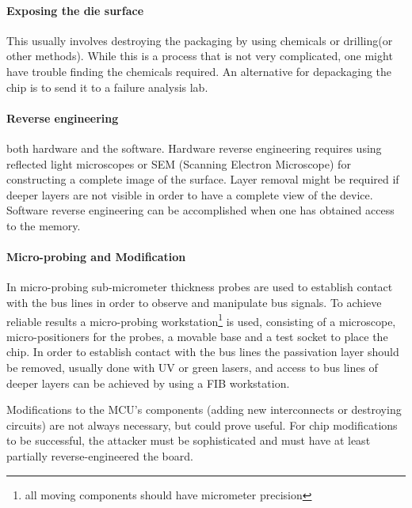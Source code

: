 	\paragraph{Exposing the die surface} This usually involves destroying the packaging by using chemicals or drilling(or other methods). While this is a process that is not very complicated\citep{sergei:thesis}, one might have trouble finding the chemicals required. An alternative for depackaging the chip is to send it to a failure analysis lab\citep{website:hacking_the_pic}.
	
	\paragraph{Reverse engineering} both hardware and the software. Hardware reverse engineering requires using reflected light microscopes or SEM (Scanning Electron Microscope) for constructing a complete image of the surface. Layer removal might be required if deeper layers are not visible in order to have a complete view of the device. Software reverse engineering can be accomplished when one has obtained access to the memory.
	
	\paragraph{Micro-probing and Modification} In micro-probing sub-micrometer thickness probes are used to establish contact with the bus lines in order to observe and manipulate bus signals. To achieve reliable results a micro-probing workstation\footnote{all moving components should have micrometer precision} is used, consisting of a microscope, micro-positioners for the probes, a movable base and a test socket to place the chip. In order to establish contact with the bus lines the passivation layer should be removed, usually done with UV or green lasers, and access to bus lines of deeper layers can be achieved by using a FIB workstation.
	
	Modifications to the MCU's components (adding new interconnects or destroying circuits) are not always necessary, but could prove useful\citep{anderson:tamper_resistance}. For chip modifications to be successful, the attacker must be sophisticated and must have at least partially reverse-engineered the board.
